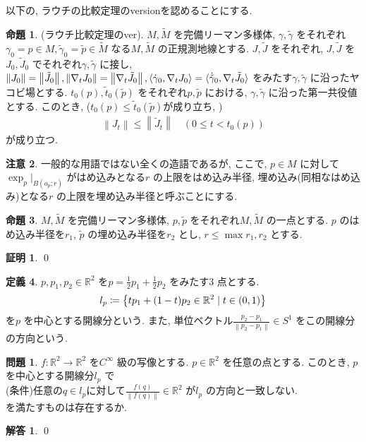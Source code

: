 \documentclass[twocolumn, landscape, a4paper , 8pt, fleqn, titlepage ]{jsarticle}
\title{}
\author{}
\date{}
\theoremstyle{definition}
\newtheorem{dfn}{定義}[section]
\newtheorem{prop}[dfn]{命題}
\newtheorem*{pf*}{証明}
\newtheorem*{problem*}{問題}
\newtheorem{remark}[dfn]{注意}
\newtheorem*{solution*}{解答}
\newcommand{\cbra}[1]{\mleft\{#1\mright\}}
\newcommand{\tbra}[1]{\mleft\langle#1\mright\rangle}
\newcommand{\ntbra}[1]{\langle#1\rangle}
\newcommand{\norm}[1]{\left\|#1\right\|}
\begin{document}
\maketitle
\scriptsize 



\section{}

以下の, ラウチの比較定理のversionを認めることにする.

\begin{prop}(ラウチ比較定理のver).
$M, \tilde M $ を完備リーマン多様体, $\gamma, \tilde \gamma$ をそれぞれ$\gamma_0 = p \in M, \tilde \gamma_0 = \tilde p \in \tilde M $ なる$M, \tilde M$ の正規測地線とする. $J, \tilde J$ をそれぞれ, $J, \tilde J$ を$J_0, \tilde J_0$ でそれぞれ$\gamma, \tilde \gamma$ に接し, $\norm{J_0} = \norm{\tilde J_0} , \norm{\nabla_t J_0} = \norm{\nabla_t \tilde J_0}, \tbra{\dot \gamma_0, \nabla_t J_0 } = \ntbra{\dot {\tilde{\gamma}}_0 , \nabla_t \tilde J_0 } $ をみたす$\gamma, \tilde \gamma$ に沿ったヤコビ場とする. $t_0(p), \tilde t_0 (\tilde p)$ をそれぞれ$p, \tilde p$ における, $\gamma, \tilde \gamma$ に沿った第一共役値とする. このとき, ($t_0(p) \leq  \tilde t_0 (\tilde p)$が成り立ち, )
\begin{align*} \norm{J_t} \leq \norm{\tilde J_t} \quad (0 \leq t < t_0 (p) )\end{align*}
が成り立つ. 
\end{prop}

\begin{remark}
一般的な用語ではない全くの造語であるが, ここで, $p \in M$ に対して$\exp_p |_{B(o_p; r)}$ がはめ込みとなる$r$ の上限をはめ込み半径, 埋め込み(同相なはめ込み)となる$r$ の上限を埋め込み半径と呼ぶことにする. 
\end{remark}


\begin{prop}
$M ,\tilde M$ を完備リーマン多様体, $p, \tilde p$ をそれぞれ$M, \tilde M$ の一点とする. $p$ のはめ込み半径を$r_1$, $\tilde p$ の埋め込み半径を$r_2$ とし, $r \leq \max{r_1, r_2}$ とする. 
\end{prop}
\begin{pf*}

\qed
\end{pf*}




\begin{dfn}
$p, p_1, p_2 \in \mathbb R^2$ を$p = \frac{1}{2}p_1 + \frac{1}{2} p_2$ をみたす$3$ 点とする. 
\begin{align*} l_p \coloneqq \cbra{t p_1 + (1-t)p_2 \in \mathbb R^2 \mid t \in (0,1)} \end{align*}
を$p$ を中心とする開線分という. また, 単位ベクトル$\frac{p_2 - p_1}{\norm{p_2 - p_1}} \in S^1$ をこの開線分の方向という. 
\end{dfn}

\begin{problem*}$f: \mathbb R^2 \rightarrow \mathbb R^2 $ を$C^\infty$ 級の写像とする. 
$p \in \mathbb R^2$ を任意の点とする. このとき, $p$ を中心とする開線分$l_{p}$ で \\
(条件)任意の$q \in l_p$に対して$\frac{f(q)}{\norm{f(q)}} \in \mathbb R^2$ が$l_p$ の方向と一致しない. \\
を満たすものは存在するか.
\end{problem*}
\begin{solution*}

\qed
\end{solution*}
\end{document}
